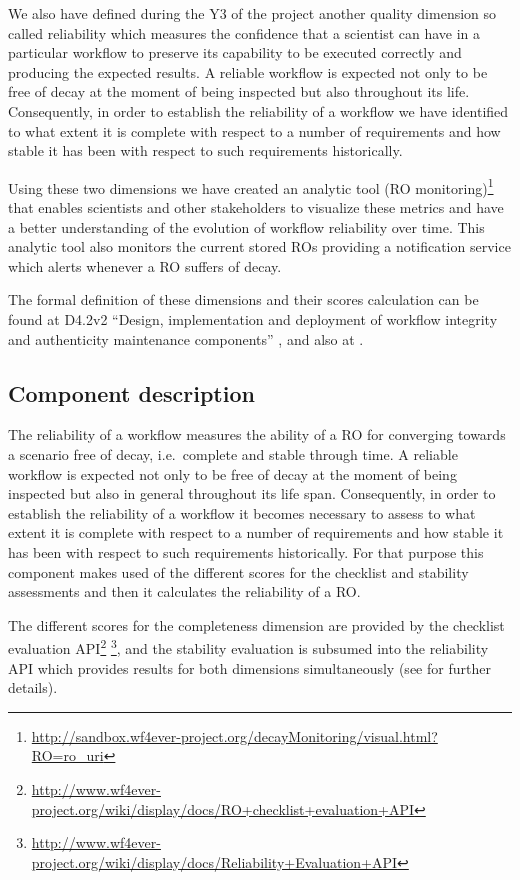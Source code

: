 We also have defined during the Y3 of the project another quality
dimension so called reliability which measures the confidence that a
scientist can have in a particular workflow to preserve its capability
to be executed correctly and producing the expected results. A reliable
workflow is expected not only to be free of decay at the moment of being
inspected but also throughout its life. Consequently, in order to
establish the reliability of a workflow we have identified to what
extent it is complete with respect to a number of requirements and how
stable it has been with respect to such requirements historically.

Using these two dimensions we have created an analytic tool (RO
monitoring)\footnote{\url{http://sandbox.wf4ever-project.org/decayMonitoring/visual.html?RO=ro_uri}}
that enables scientists and other stakeholders to visualize these
metrics and have a better understanding of the evolution of workflow
reliability over time. This analytic tool also monitors the current
stored ROs providing a notification service which alerts whenever a RO
suffers of decay.

The formal definition of these dimensions and their scores calculation
can be found at D4.2v2 ``Design, implementation and deployment of
workflow integrity and authenticity maintenance components''
\cite{D4.2v2}, and also at \cite{wf_reliability} \cite{wf_history}.

\subsection{Component description}

The reliability of a workflow measures the ability of a RO for
converging towards a scenario free of decay, i.e.~complete and stable
through time. A reliable workflow is expected not only to be free of
decay at the moment of being inspected but also in general throughout
its life span. Consequently, in order to establish the reliability of a
workflow it becomes necessary to assess to what extent it is complete
with respect to a number of requirements and how stable it has been with
respect to such requirements historically. For that purpose this
component makes used of the different scores for the checklist and
stability assessments and then it calculates the reliability of a RO.

The different scores for the completeness dimension are provided by the
checklist evaluation API\footnote{\url{http://www.wf4ever-project.org/wiki/display/docs/RO+checklist+evaluation+API}}
\footnote{\url{http://www.wf4ever-project.org/wiki/display/docs/Reliability+Evaluation+API}},
and the stability evaluation is subsumed into the reliability API which
provides results for both dimensions simultaneously (see \cite{D4.2v2}
for further details).

